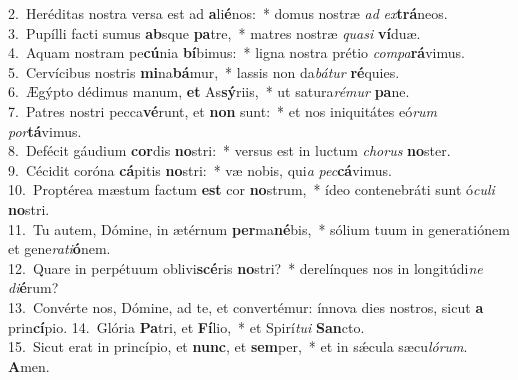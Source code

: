 {2.~}Heréditas nostra versa est ad \textbf{a}li\textbf{é}nos:~* domus nostræ \textit{ad} \textit{ex}\textbf{trá}neos.\\
{3.~}Pupílli facti sumus \textbf{ab}sque \textbf{pa}tre,~* matres nostræ \textit{qua}\textit{si} \textbf{ví}duæ.\\
{4.~}Aquam nostram pe\textbf{cú}nia \textbf{bí}bimus:~* ligna nostra prétio \textit{com}\textit{pa}\textbf{rá}vimus.\\
{5.~}Cervícibus nostris \textbf{mi}na\textbf{bá}mur,~* lassis non da\textit{bá}\textit{tur} \textbf{ré}quies.\\
{6.~}Ægýpto dédimus manum, \textbf{et} As\textbf{sý}riis,~* ut satura\textit{ré}\textit{mur} \textbf{pa}ne.\\
{7.~}Patres nostri pecca\textbf{vé}runt, et \textbf{non} sunt:~* et nos iniquitátes eó\textit{rum} \textit{por}\textbf{tá}vimus.\\
{8.~}Defécit gáudium \textbf{cor}dis \textbf{no}stri:~* versus est in luctum \textit{cho}\textit{rus} \textbf{no}ster.\\
{9.~}Cécidit coróna \textbf{cá}pitis \textbf{no}stri:~* væ nobis, qui\textit{a} \textit{pec}\textbf{cá}vimus.\\
{10.~}Proptérea mæstum factum \textbf{est} cor \textbf{no}strum,~* ídeo contenebráti sunt ó\textit{cu}\textit{li} \textbf{no}stri.\\
{11.~}Tu autem, Dómine, in ætérnum \textbf{per}ma\textbf{né}bis,~* sólium tuum in generatiónem et gene\textit{ra}\textit{ti}\textbf{ó}nem.\\
{12.~}Quare in perpétuum oblivi\textbf{scé}ris \textbf{no}stri?~* derelínques nos in longitúdi\textit{ne} \textit{di}\textbf{é}rum?\\
{13.~}Convérte nos, Dómine, ad te, et convertémur: ínnova dies nostros, sicut \textbf{a} prin\textbf{cí}pio.
{14.~}Glória \textbf{Pa}tri, et \textbf{Fí}lio,~* et Spirí\textit{tu}\textit{i} \textbf{San}cto.\\
{15.~}Sicut erat in princípio, et \textbf{nunc}, et \textbf{sem}per,~* et in sǽcula sæcu\textit{ló}\textit{rum}. \textbf{A}men.\\
